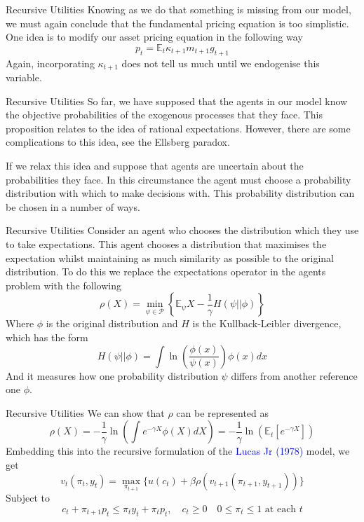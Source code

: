 \documentclass[aspectratio=169,xcolor=dvipsnames]{beamer}
\begin{document}
\begin{frame}{Recursive Utilities}
    Knowing as we do that something is missing from our model, we must again conclude that the fundamental pricing equation is too simplistic. One idea is to modify our asset pricing equation in the following way
    \[
        p_t = \mathbb{E}_t \kappa_{t+1} m_{t+1} g_{t+1}
    \]
    Again, incorporating $\kappa_{t+1}$ does not tell us much until we endogenise this variable.
\end{frame}

\begin{frame}{Recursive Utilities}
    So far, we have supposed that the agents in our model know the objective probabilities of the exogenous processes that they face. This proposition relates to the idea of rational expectations. However, there are some complications to this idea, see the Ellsberg paradox.

    If we relax this idea and suppose that agents are uncertain about the probabilities they face. In this circumstance the agent must choose a probability distribution with which to make decisions with. This probability distribution can be chosen in a number of ways.
\end{frame}

\begin{frame}{Recursive Utilities}
    Consider an agent who chooses the distribution which they use to take expectations. This agent chooses a distribution that maximises the expectation whilst maintaining as much similarity as possible to the original distribution. To do this we replace the expectations operator in the agents problem with the following
    \[
        \rho(X) = \min_{\psi \in \mathcal{P}} \left\{ \mathbb{E}_\psi X - \frac{1}{\gamma} H(\psi || \phi) \right\}
    \]
    Where $\phi$ is the original distribution and $H$ is the Kullback-Leibler divergence, which has the form
    \[
        H(\psi || \phi) = \int \ln \left( \frac{\phi(x)}{\psi(x)}\right) \phi(x) dx
    \]
    And it measures how one probability distribution $\psi$ differs from another reference one $\phi$.
\end{frame}

\begin{frame}{Recursive Utilities}
    We can show that $\rho$ can be represented as
    \[
        \rho(X) = -\frac{1}{\gamma} \ln \left( \int e^{-\gamma X} \phi(X) dX\right) = -\frac{1}{\gamma} \ln \left(\mathbb{E}_t [e^{-\gamma X}]\right)
    \]
    Embedding this into the recursive formulation of the \textcolor{blue}{Lucas Jr (1978)} model, we get
    \[
        v_t(\pi_t, y_t) = \max_{\pi_{t+1}} \{ u(c_t) + \beta \rho(v_{t+1}(\pi_{t+1}, y_{t+1}))\}
    \]
    Subject to
    \[
        c_t + \pi_{t+1} p_t \le \pi_t y_t + \pi_t p_t, \quad c_t \ge 0 \quad 0 \le \pi_t \le 1 \text{ at each } t
    \]
\end{frame}
\end{document}
